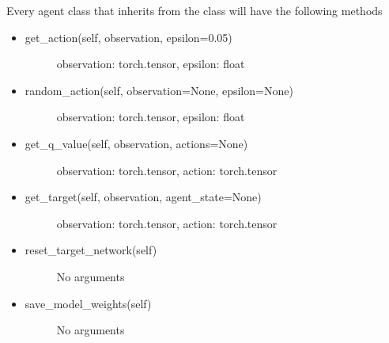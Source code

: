 \documentclass[letterpaper,10pt,english]{sphinxmanual}
\begin{document}
\sphinxAtStartPar
Every agent class that inherits from the  class will have the following methods
\begin{itemize}
\item {} \begin{description}
\item[{get\_action(self, observation, epsilon=0.05)}] \leavevmode
\sphinxAtStartPar
observation: torch.tensor, epsilon: float

\end{description}

\item {} \begin{description}
\item[{random\_action(self, observation=None, epsilon=None)}] \leavevmode
\sphinxAtStartPar
observation: torch.tensor, epsilon: float

\end{description}

\item {} \begin{description}
\item[{get\_q\_value(self, observation, actions=None)}] \leavevmode
\sphinxAtStartPar
observation: torch.tensor, action: torch.tensor

\end{description}

\item {} \begin{description}
\item[{get\_target(self, observation, agent\_state=None)}] \leavevmode
\sphinxAtStartPar
observation: torch.tensor, action: torch.tensor

\end{description}

\item {} \begin{description}
\item[{reset\_target\_network(self)}] \leavevmode
\sphinxAtStartPar
No arguments

\end{description}

\item {} \begin{description}
\item[{save\_model\_weights(self)}] \leavevmode
\sphinxAtStartPar
No arguments

\end{description}

\end{itemize}
\end{document}
